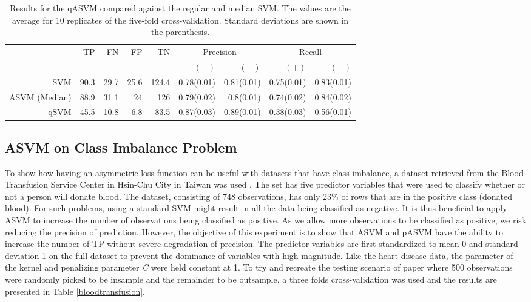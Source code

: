 \documentclass[twoside,11pt]{article}
\begin{document}
\begin{table}[htbp]\label{table:HeartDisease3}
  \centering
    \small\begin{tabular}{rrrrrrrrr}
    \hline
       & \multirow{2}{*}{TP}    & \multirow{2}{*}{FN}    & \multirow{2}{*}{FP}    & \multirow{2}{*}{TN} & \multicolumn{2}{c}{Precision} & \multicolumn{2}{c}{Recall}\\
&&&&&  $(+)$ &  $(-)$ &  $(+)$ &  $(-)$ \bigstrut\\
\hline
\hline
SVM   & 90.3  & 29.7  & 25.6  & 124.4 & 0.78(0.01) & 0.81(0.01) & 0.75(0.01) & 0.83(0.01) \bigstrut[t]\\
ASVM (Median) & 88.9  & 31.1  & 24    & 126   & 0.79(0.02) & 0.8(0.01) & 0.74(0.02) & 0.84(0.02) \\
qSVM  & 45.5  & 10.8  & 6.8   & 83.5  & 0.87(0.03) & 0.89(0.01) & 0.38(0.03) & 0.56(0.01) \bigstrut[b]\\
\hline
\hline
    \end{tabular}%
    \caption{Results for the qASVM compared against the regular and median SVM. The values are the average for 10 replicates of the five-fold cross-validation. Standard deviations are shown in the parenthesis.}
\end{table}%


\subsection{ASVM on Class Imbalance Problem}
To show how having an asymmetric loss function can be useful with datasets that have class imbalance, a dataset retrieved from the Blood Transfusion Service Center in Hsin-Chu City in Taiwan was used \citep{Yeh09}. The set has five predictor variables that were used to classify whether or not a person will donate blood. The dataset, consisting of 748 observations, has only 23\% of rows that are in the positive class (donated blood). For such problems, using a standard SVM might result in all the data being classified as negative. It is thus beneficial to apply ASVM to increase the number of observations being classified as positive. As we allow more observations to be classified as positive, we risk reducing the precision of prediction. However, the objective of this experiment is to show that ASVM and pASVM have the ability to increase the number of TP without severe degradation of precision. The predictor variables are first standardized to mean 0 and standard deviation 1 on the full dataset to prevent the dominance of variables with high magnitude. Like the heart disease data, the parameter of the kernel and penalizing parameter \emph{C} were held constant at 1. To try and recreate the testing scenario of \citet{Yeh09} paper where 500 observations were randomly picked to be insample and the remainder to be outsample, a three folds cross-validation was used and the results are presented in Table \ref{bloodtransfusion}.
\end{document}
